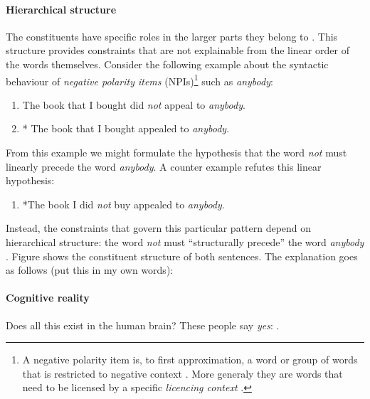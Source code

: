 \paragraph{Hierarchical structure} The constituents have specific roles in the larger parts they belong to \citep{huddleston2002grammar}. This structure provides constraints that are not explainable from the linear order of the words themselves. Consider the following example about the syntactic behaviour of \textit{negative polarity items} (NPIs)\footnote{A negative polarity item is, to first approximation, a word or group of words that is restricted to negative context \citep{everaert2015structures}. More generaly they are words that need to be licensed by a specific \textit{licencing context} \citep{giannakidou2011npi}.} such as \textit{anybody}:
\begin{enumerate}[noitemsep]
  \item The book that I bought did \textit{not} appeal to \textit{anybody}.
  \item * The book that I bought appealed to \textit{anybody}.
\end{enumerate}
From this example we might formulate the hypothesis that the word \textit{not} must linearly precede the word \textit{anybody}. A counter example refutes this linear hypothesis:
\begin{enumerate}
  \item *The book I did \textit{not} buy appealed to \textit{anybody}.
\end{enumerate}
Instead, the constraints that govern this particular pattern depend on hierarchical structure: the word \textit{not} must ``structurally precede'' the word \textit{anybody} \citep{everaert2015structures}. Figure \label{ref:trees-npi} shows the constituent structure of both sentences. The explanation goes as follows (put this in my own words): 

\paragraph{Cognitive reality} Does all this exist in the human brain? These people say \textit{yes}: \citep{hale2001earley,levy2008expectation,brennan2016abstract}.


